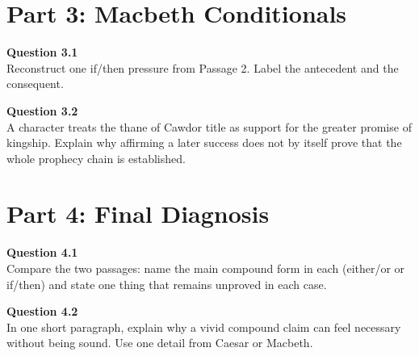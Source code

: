 \documentclass[12pt]{article}
\begin{document}
\section*{Part 3: Macbeth Conditionals}

\textbf{Question 3.1}\\[-0.15em]
Reconstruct one if/then pressure from Passage 2. Label the antecedent and the consequent.


\textbf{Question 3.2}\\[-0.15em]
A character treats the thane of Cawdor title as support for the greater promise of kingship. Explain why affirming a later success does not by itself prove that the whole prophecy chain is established.


\newpage

\section*{Part 4: Final Diagnosis}

\textbf{Question 4.1}\\[-0.15em]
Compare the two passages: name the main compound form in each (either/or or if/then) and state one thing that remains unproved in each case.


\textbf{Question 4.2}\\[-0.15em]
In one short paragraph, explain why a vivid compound claim can feel necessary without being sound. Use one detail from Caesar or Macbeth.

\end{document}
